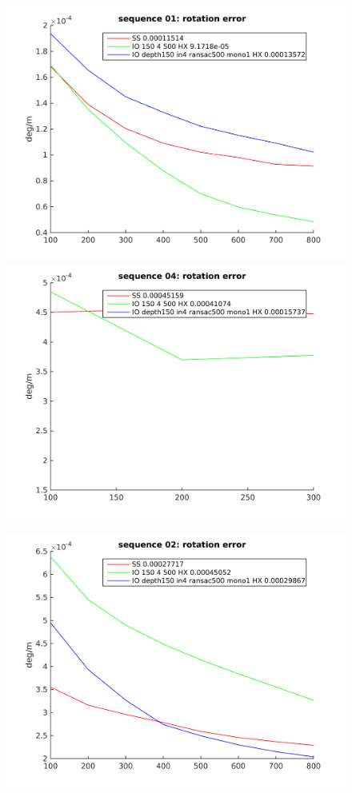 \documentclass[runningheads]{llncs}
\begin{document}
\begin{figure}
\begin{minipage}[t]{.3\linewidth}
    \includegraphics[width=\textwidth]{rotation_error_01}
    \includegraphics[width=\textwidth]{rotation_error_04}
  \end{minipage}
  \begin{minipage}[t]{.3\linewidth}
    \centering
    \includegraphics[width=\textwidth]{rotation_error_02}

\end{minipage}
\end{figure}
\end{document}
